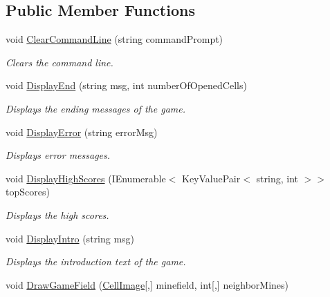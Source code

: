 \subsection*{Public Member Functions}
\begin{DoxyCompactItemize}
\item 
void \hyperlink{interface_minesweeper_1_1_game_1_1_i_u_i_manager_aafbe4485c18fe5dd0269a1a54599d1fc}{Clear\+Command\+Line} (string command\+Prompt)
\begin{DoxyCompactList}\small\item\em Clears the command line. \end{DoxyCompactList}\item 
void \hyperlink{interface_minesweeper_1_1_game_1_1_i_u_i_manager_a7df49d712d01db2b9e9b36218667cc23}{Display\+End} (string msg, int number\+Of\+Opened\+Cells)
\begin{DoxyCompactList}\small\item\em Displays the ending messages of the game. \end{DoxyCompactList}\item 
void \hyperlink{interface_minesweeper_1_1_game_1_1_i_u_i_manager_afa8d49b68057b38c302d945c829e1856}{Display\+Error} (string error\+Msg)
\begin{DoxyCompactList}\small\item\em Displays error messages. \end{DoxyCompactList}\item 
void \hyperlink{interface_minesweeper_1_1_game_1_1_i_u_i_manager_a562c29c1904a923494c26511e0a6a3d8}{Display\+High\+Scores} (I\+Enumerable$<$ Key\+Value\+Pair$<$ string, int $>$$>$ top\+Scores)
\begin{DoxyCompactList}\small\item\em Displays the high scores. \end{DoxyCompactList}\item 
void \hyperlink{interface_minesweeper_1_1_game_1_1_i_u_i_manager_a0a8ff25e5b1a5013bdbf2c5b7a5f82c3}{Display\+Intro} (string msg)
\begin{DoxyCompactList}\small\item\em Displays the introduction text of the game. \end{DoxyCompactList}\item 
void \hyperlink{interface_minesweeper_1_1_game_1_1_i_u_i_manager_acae1778c1bdc80065c2b18afb1d11a70}{Draw\+Game\+Field} (\hyperlink{namespace_minesweeper_adf92d608047dafd69d16008492d317bd}{Cell\+Image}\mbox{[},\mbox{]} minefield, int\mbox{[},\mbox{]} neighbor\+Mines)
$$
\end{DoxyCompactItemize}
